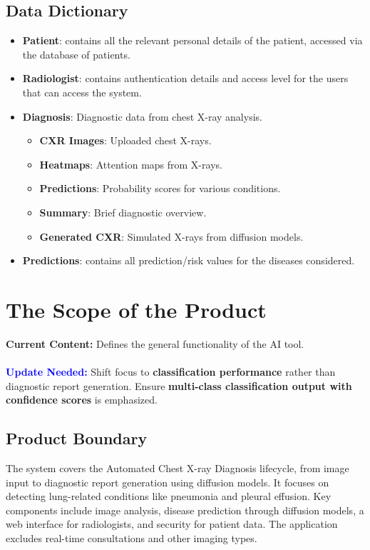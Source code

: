 \documentclass[12pt]{article}
\begin{document}
\subsection{Data Dictionary}
\begin{itemize}
    \item \textbf{Patient}: contains all the relevant personal details of the patient, accessed via the database of patients.

    \item \textbf{Radiologist}: contains authentication details and access level for the users that can access the system.

    \item \textbf{Diagnosis}: Diagnostic data from chest X-ray analysis.
    \begin{itemize}
        \item \textbf{CXR Images}: Uploaded chest X-rays.
        \item \textbf{Heatmaps}: Attention maps from X-rays.
        \item \textbf{Predictions}: Probability scores for various conditions.
        \item \textbf{Summary}: Brief diagnostic overview.
        \item \textbf{Generated CXR}: Simulated X-rays from diffusion models.
    \end{itemize}

    \item \textbf{Predictions}: contains all prediction/risk values for the diseases considered.
\end{itemize}

\section{The Scope of the Product}

\textbf{Current Content:} Defines the general functionality of the AI tool. \\
\\
\textbf{\textcolor{blue}{Update Needed:}} Shift focus to \textbf{classification performance} rather than diagnostic report generation. Ensure \textbf{multi-class classification output with confidence scores} is emphasized.

\subsection{Product Boundary}
The system covers the Automated Chest X-ray Diagnosis lifecycle, from image input to diagnostic report generation using diffusion models. It focuses on detecting lung-related conditions like pneumonia and pleural effusion. Key components include image analysis, disease prediction through diffusion models, a web interface for radiologists, and security for patient data. The application excludes real-time consultations and other imaging types.
\end{document}
